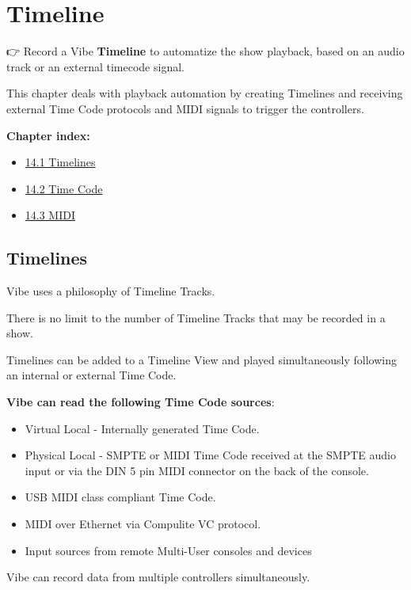 \documentclass[
]{article}
\providecommand{\tightlist}{%
  \setlength{\itemsep}{0pt}\setlength{\parskip}{0pt}}
\begin{document}
\hypertarget{timeline}{%
\section{Timeline}\label{timeline}}

👉 Record a Vibe \textbf{Timeline} to automatize the show playback, based on an audio track or an external timecode signal.

This chapter deals with playback automation by creating Timelines and receiving external Time Code protocols and MIDI signals to trigger the controllers.

\textbf{Chapter index:}

\begin{itemize}
\tightlist
\item
  \protect\hyperlink{Timelines-14.1}{14.1 Timelines}
\item
  \protect\hyperlink{Time-Code-14.2}{14.2 Time Code}
\item
  \protect\hyperlink{MIDI-14.3}{14.3 MIDI}
\end{itemize}

\hypertarget{Timelines-14.1}{%
\subsection{Timelines}\label{Timelines-14.1}}

Vibe uses a philosophy of Timeline Tracks.

There is no limit to the number of Timeline Tracks that may be recorded in a show.

Timelines can be added to a Timeline View and played simultaneously following an internal or external Time Code.

\textbf{Vibe can read the following Time Code sources}:

\begin{itemize}
\item
  Virtual Local - Internally generated Time Code.
\item
  Physical Local - SMPTE or MIDI Time Code received at the SMPTE audio input or via the DIN 5 pin MIDI connector on the back of the console.
\item
  USB MIDI class compliant Time Code.
\item
  MIDI over Ethernet via Compulite VC protocol.
\item
  Input sources from remote Multi-User consoles and devices
\end{itemize}

Vibe can record data from multiple controllers simultaneously.
\end{document}
